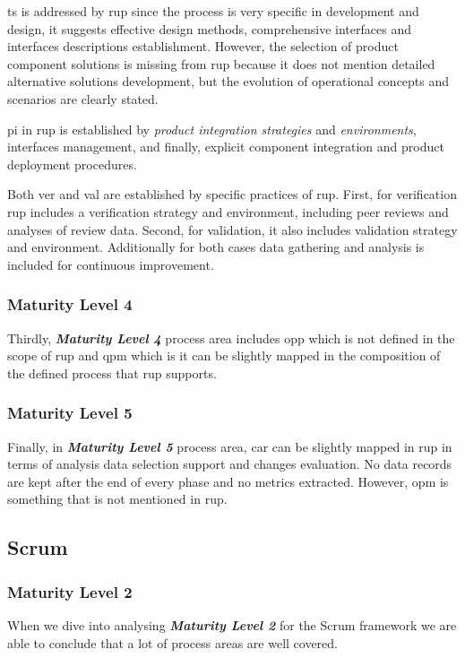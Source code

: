 \ac{ts} is addressed by \ac{rup} since the process is very specific in development and design, it suggests effective design methods, comprehensive interfaces and interfaces descriptions establishment. However, the selection of product component solutions is missing from \ac{rup} because it does not mention detailed alternative solutions development, but the evolution of operational concepts and scenarios are clearly stated.

\ac{pi} in \ac{rup} is established by \textit{product integration strategies} and \textit{environments}, interfaces management, and finally, explicit component integration and product deployment procedures.

Both \ac{ver} and \ac{val} are established by specific practices of \ac{rup}. First, for verification \ac{rup} includes a verification strategy and environment, including peer reviews and analyses of review data. Second, for validation, it also includes validation strategy and environment. Additionally for both cases data gathering and analysis is included for continuous improvement.

\subsubsection{Maturity Level 4}
Thirdly, \textbf{\textit{Maturity Level 4}} process area includes \ac{opp} which is not defined in the scope of \ac{rup} and \ac{qpm} which is it can be slightly mapped in the composition of the defined process that \ac{rup} supports.

\subsubsection{Maturity Level 5}
Finally, in \textbf{\textit{Maturity Level 5}} process area, \ac{car} can be slightly mapped in \ac{rup} in terms of analysis data selection support and changes evaluation. No data records are kept after the end of every phase and no metrics extracted.
However, \ac{opm} is something that is not mentioned in \ac{rup}.

\subsection{Scrum}
\subsubsection{Maturity Level 2}
When we dive into analysing \textbf{\textit{Maturity Level 2}} for the Scrum framework we are able to conclude that a lot of process areas are well covered. 


